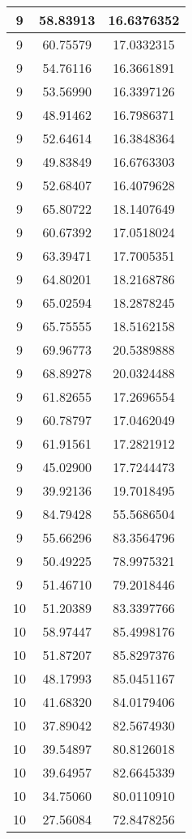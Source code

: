 \documentclass[
]{book}
\begin{document}
\begin{tabular}{c|c|c}
\hline
9 & 58.83913 & 16.6376352\\
\hline
9 & 60.75579 & 17.0332315\\
\hline
9 & 54.76116 & 16.3661891\\
\hline
9 & 53.56990 & 16.3397126\\
\hline
9 & 48.91462 & 16.7986371\\
\hline
9 & 52.64614 & 16.3848364\\
\hline
9 & 49.83849 & 16.6763303\\
\hline
9 & 52.68407 & 16.4079628\\
\hline
9 & 65.80722 & 18.1407649\\
\hline
9 & 60.67392 & 17.0518024\\
\hline
9 & 63.39471 & 17.7005351\\
\hline
9 & 64.80201 & 18.2168786\\
\hline
9 & 65.02594 & 18.2878245\\
\hline
9 & 65.75555 & 18.5162158\\
\hline
9 & 69.96773 & 20.5389888\\
\hline
9 & 68.89278 & 20.0324488\\
\hline
9 & 61.82655 & 17.2696554\\
\hline
9 & 60.78797 & 17.0462049\\
\hline
9 & 61.91561 & 17.2821912\\
\hline
9 & 45.02900 & 17.7244473\\
\hline
9 & 39.92136 & 19.7018495\\
\hline
9 & 84.79428 & 55.5686504\\
\hline
9 & 55.66296 & 83.3564796\\
\hline
9 & 50.49225 & 78.9975321\\
\hline
9 & 51.46710 & 79.2018446\\
\hline
10 & 51.20389 & 83.3397766\\
\hline
10 & 58.97447 & 85.4998176\\
\hline
10 & 51.87207 & 85.8297376\\
\hline
10 & 48.17993 & 85.0451167\\
\hline
10 & 41.68320 & 84.0179406\\
\hline
10 & 37.89042 & 82.5674930\\
\hline
10 & 39.54897 & 80.8126018\\
\hline
10 & 39.64957 & 82.6645339\\
\hline
10 & 34.75060 & 80.0110910\\
\hline
10 & 27.56084 & 72.8478256\\

\end{tabular}
\end{document}

